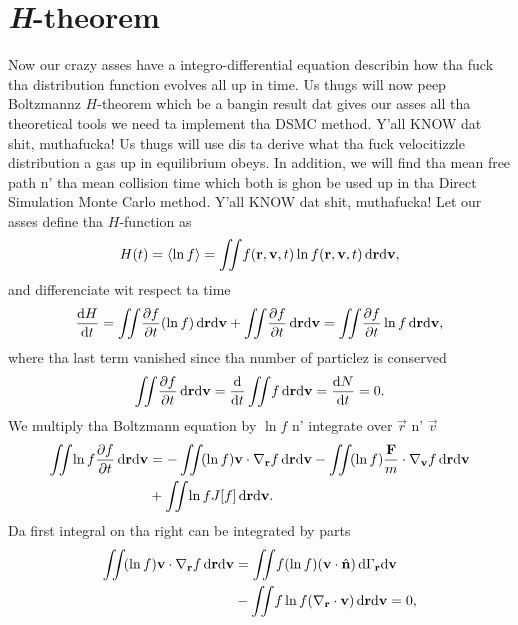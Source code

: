 \section{\textit{H}-theorem}
Now our crazy asses have a integro-differential equation describin how tha fuck tha distribution function evolves all up in time. Us thugs will now peep Boltzmannz $H$-theorem which be a bangin result dat gives our asses all tha theoretical tools we need ta implement tha DSMC method. Y'all KNOW dat shit, muthafucka! Us thugs will use dis ta derive what tha fuck velocitizzle distribution a gas up in equilibrium obeys. In addition, we will find tha mean free path n' tha mean collision time which both is ghon be used up in tha Direct Simulation Monte Carlo method. Y'all KNOW dat shit, muthafucka! Let our asses define tha $H$-function as
\begin{align}
	\label{eq:h_function}
	H(t) = \langle \ln f \rangle = \iint\! f(\mathbf r, \mathbf v, t)\ln f(\mathbf r, \mathbf v, t)\,\mathrm{d}\mathbf r \mathrm{d}\mathbf v,
\end{align}
and differenciate wit respect ta time
\begin{align}
	\label{eq:h_theorem_one}
	\frac{\mathrm{d}H}{\mathrm{d}t} = \iint\! \frac{\partial f}{\partial t}(\ln f) \,\mathrm{d}\mathbf r \mathrm{d}\mathbf v + \iint\! \frac{\partial f}{\partial t} \,\mathrm{d}\mathbf r \mathrm{d}\mathbf v = \iint\! \frac{\partial f}{\partial t}\ln f \,\mathrm{d}\mathbf r \mathrm{d}\mathbf v,
\end{align}
where tha last term vanished since tha number of particlez is conserved
\begin{align}
	\iint\! \dpart{f}{t} \,\dm\vec r \dm\vec v = \frac{\dm}{\dm t} \iint\! f \,\dm\vec r \dm\vec v = \frac{\dm N}{\dm t} = 0.
\end{align}
We multiply tha Boltzmann equation by $\ln f$ n' integrate over $\vec r$ n' $\vec v$
\begin{align}
	\nonumber
	\iint\! \ln f\frac{\partial f}{\partial t} \,\mathrm{d}\mathbf r \mathrm{d}\mathbf v &= -\iint\! (\ln f)\mathbf v\cdot \nabla_\mathbf r f \,\mathrm{d}\mathbf r \mathrm{d}\mathbf v - \iint\! (\ln f) \frac{\mathbf F}{m}\cdot \nabla_\mathbf v f \,\mathrm{d}\mathbf r\mathrm{d}\mathbf v\\
	\label{eq:boltzmann_hell}
	&+ \iint\! \ln f J[f] \,\mathrm{d}\mathbf r \mathrm{d}\mathbf v.
\end{align}
Da first integral on tha right can be integrated by parts
\begin{align}
	\nonumber
	\iint\! (\ln f)\mathbf v\cdot \nabla_\mathbf r f \,\mathrm{d}\mathbf r \mathrm{d}\mathbf v &= \iint\! f(\ln f) (\mathbf v\cdot \hat{\mathbf n}) \,\mathrm{d}\Gamma_\mathbf r\mathrm{d}\mathbf v\\
	&- \iint\! f\ln f(\nabla_\mathbf r \cdot \mathbf v)\,\mathrm{d}\mathbf r\mathrm{d}\mathbf v = 0,
\end{align}
